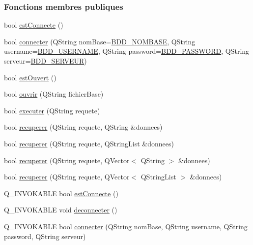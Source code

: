 \subsubsection*{Fonctions membres publiques}
\begin{DoxyCompactItemize}
\item 
bool \hyperlink{class_base_de_donnees_a00388973f3ec42e5c8e76e7af7e124b2}{est\+Connecte} ()
\item 
bool \hyperlink{class_base_de_donnees_ac20da193923a9bfea5e38ee5a54820cd}{connecter} (Q\+String nom\+Base=\hyperlink{e-stock_8h_a45f8f15b8f9a7ab4c2b219038ff64f6b}{B\+D\+D\+\_\+\+N\+O\+M\+B\+A\+SE}, Q\+String username=\hyperlink{e-stock_8h_a88b5f5b81fa534553c68802384beff2c}{B\+D\+D\+\_\+\+U\+S\+E\+R\+N\+A\+ME}, Q\+String password=\hyperlink{e-stock_8h_ae2ded9166ed2553182545e97514c04f7}{B\+D\+D\+\_\+\+P\+A\+S\+S\+W\+O\+RD}, Q\+String serveur=\hyperlink{e-stock_8h_a423559dc987673b8aacaa9f369839bb0}{B\+D\+D\+\_\+\+S\+E\+R\+V\+E\+UR})
\item 
bool \hyperlink{class_base_de_donnees_af9ac332082ffd0dd35e412cefabe5e9c}{est\+Ouvert} ()
\item 
bool \hyperlink{class_base_de_donnees_a7f6a5510b08017b0d99115a84252f186}{ouvrir} (Q\+String fichier\+Base)
\item 
bool \hyperlink{class_base_de_donnees_aa8de5f8f8bb17edc43f5c0ee33712081}{executer} (Q\+String requete)
\item 
bool \hyperlink{class_base_de_donnees_a77539baad389f5acf754cd2cd452403e}{recuperer} (Q\+String requete, Q\+String \&donnees)
\item 
bool \hyperlink{class_base_de_donnees_a2a5c461fa11d404810ae3ebe035d5190}{recuperer} (Q\+String requete, Q\+String\+List \&donnees)
\item 
bool \hyperlink{class_base_de_donnees_af9a76eb2b12df784280c379a4b22af62}{recuperer} (Q\+String requete, Q\+Vector$<$ Q\+String $>$ \&donnees)
\item 
bool \hyperlink{class_base_de_donnees_a68dd0d62ba03b9e8e5aa759d0666cb59}{recuperer} (Q\+String requete, Q\+Vector$<$ Q\+String\+List $>$ \&donnees)
\item 
Q\+\_\+\+I\+N\+V\+O\+K\+A\+B\+LE bool \hyperlink{class_base_de_donnees_aac406beb5ea0e786415eca02a94633fd}{est\+Connecte} ()
\item 
Q\+\_\+\+I\+N\+V\+O\+K\+A\+B\+LE void \hyperlink{class_base_de_donnees_ae780999d25a26a0e4dbe0706a4785978}{deconnecter} ()
\item 
Q\+\_\+\+I\+N\+V\+O\+K\+A\+B\+LE bool \hyperlink{class_base_de_donnees_ae0c8aba4ae9367ca509a96af74f9c646}{connecter} (Q\+String nom\+Base, Q\+String username, Q\+String password, Q\+String serveur)

\end{DoxyCompactItemize}
